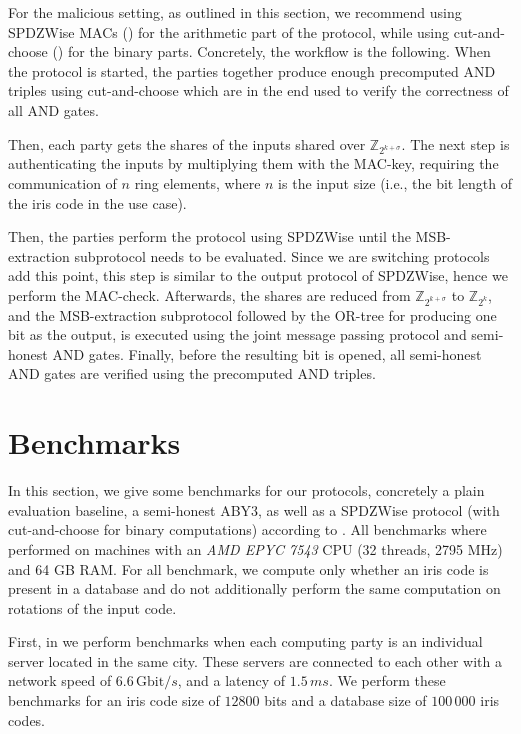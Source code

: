 \documentclass[a4paper,11pt,
]{article}
\newcommand{\Z}{\ensuremath{\mathbb{Z}}\xspace}
\begin{document}
For the malicious setting, as outlined in this section, we recommend using SPDZWise MACs () for the arithmetic part of the protocol, while using cut-and-choose () for the binary parts. Concretely, the workflow is the following. When the protocol is started, the parties together produce enough precomputed AND triples using cut-and-choose which are in the end used to verify the correctness of all AND gates.

Then, each party gets the shares of the inputs shared over $\Z_{2^{k + \sigma}}$. The next step is authenticating the inputs by multiplying them with the MAC-key, requiring the communication of $n$ ring elements, where $n$ is the input size (i.e., the bit length of the iris code in the use case).

Then, the parties perform the protocol using SPDZWise until the MSB-extraction subprotocol needs to be evaluated. Since we are switching protocols add this point, this step is similar to the output protocol of SPDZWise, hence we perform the MAC-check. Afterwards, the shares are reduced from $\Z_{2^{k + \sigma}}$ to $\Z_{2^k}$, and the MSB-extraction subprotocol followed by the OR-tree for producing one bit as the output, is executed using the joint message passing protocol and semi-honest AND gates. Finally, before the resulting bit is opened, all semi-honest AND gates are verified using the precomputed AND triples.


\section{Benchmarks} \label{sec::bench}

In this section, we give some benchmarks for our protocols, concretely a plain evaluation baseline, a semi-honest ABY3, as well as a SPDZWise protocol (with cut-and-choose for binary computations) according to . All benchmarks where performed on machines with an \textit{AMD EPYC 7543} CPU (32 threads, 2795 MHz) and 64 GB RAM. For all benchmark, we compute only whether an iris code is present in a database and do not additionally perform the same computation on rotations of the input code.

First, in  we perform benchmarks when each computing party is an individual server located in the same city. These servers are connected to each other with a network speed of $6.6\,\text{Gbit}/s$, and a latency of $1.5\,ms$. We perform these benchmarks for an iris code size of $12800$ bits and a database size of $100\,000$ iris codes.
\end{document}
